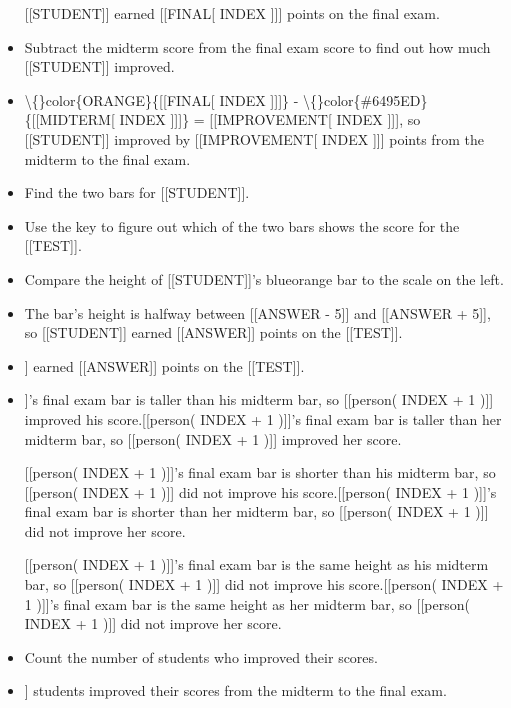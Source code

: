 \documentclass{article}
\begin{document}
\begin{itemize}
                            [[STUDENT]] earned [[FINAL[ INDEX ]]] points on the final exam.
  \item Subtract the midterm score from the final exam score to find out how much [[STUDENT]] improved.
  \item \textbackslash\{\}color\{ORANGE\}\{[[FINAL[ INDEX ]]]\} - \textbackslash\{\}color\{\#6495ED\}\{[[MIDTERM[ INDEX ]]]\} = [[IMPROVEMENT[ INDEX ]]], so
                        [[STUDENT]] improved by [[IMPROVEMENT[ INDEX ]]] points from the midterm to the final exam.
  \item Find the two bars for [[STUDENT]].
  \item Use the key to figure out which of the two bars shows the score for the [[TEST]].
  \item Compare the height of [[STUDENT]]'s blueorange bar to the scale on the left.
  \item The bar's height is halfway between [[ANSWER - 5]] and [[ANSWER + 5]], so
                        [[STUDENT]] earned [[ANSWER]] points on the [[TEST]].
  \item [[STUDENT]] earned [[ANSWER]] points on the [[TEST]].
  \item [[person( INDEX + 1 )]]'s final exam bar is taller than his
                            midterm bar, so [[person( INDEX + 1 )]] improved his score.[[person( INDEX + 1 )]]'s final exam bar is taller than her
                            midterm bar, so [[person( INDEX + 1 )]] improved her score.
                            
                        
                        
                            [[person( INDEX + 1 )]]'s final exam bar is shorter than his
                            midterm bar, so [[person( INDEX + 1 )]] did not improve his score.[[person( INDEX + 1 )]]'s final exam bar is shorter than her
                            midterm bar, so [[person( INDEX + 1 )]] did not improve her score.
                        
                        
                            [[person( INDEX + 1 )]]'s final exam bar is the same height as his
                            midterm bar, so [[person( INDEX + 1 )]] did not improve his score.[[person( INDEX + 1 )]]'s final exam bar is the same height as her
                            midterm bar, so [[person( INDEX + 1 )]] did not improve her score.
  \item Count the number of students who improved their scores.
  \item [[NUM\_IMPROVED]] students improved their scores from the midterm to the final exam.
\end{itemize}
\end{document}
